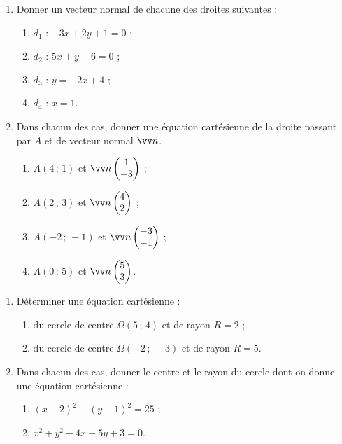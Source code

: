 \documentclass[a4paper,11pt]{article}
\begin{document}
\begin{cexercice}
\vspace{-0.8\baselineskip}
\begin{enumerate}[leftmargin=*]
	\item Donner un vecteur normal de chacune des droites suivantes :
	\begin{enumerate}
		\item $d_1$ : $-3x + 2y + 1 = 0$ ;
		\item $d_2$ : $5x + y - 6 = 0$ ;
		\item $d_3$ : $y=-2x+4$ ;
		\item $d_4$ : $x=1$.
	\end{enumerate}
	\item Dans chacun des cas, donner une équation cartésienne de la droite passant par $A$ et de vecteur normal $\vect{n}$.
	\begin{enumerate}
		\item $A(4\,;\,1)$ et $\vect{n} \coordeux{1}{-3}$ ;
		\item $A(2\,;\,3)$ et $\vect{n} \coordeux{4}{2}$ ;
		\item $A(-2\,;\,-1)$ et $\vect{n} \coordeux{-3}{-1}$ ;
		\item $A(0\,;\,5)$ et $\vect{n} \coordeux{5}{3}$.
	\end{enumerate}
\end{enumerate}
\end{cexercice}

\begin{cexercice}
\vspace{-0.8\baselineskip}
\begin{enumerate}[leftmargin=*]
	\item Déterminer une équation cartésienne :
	\begin{enumerate}
		\item du cercle de centre $\Omega(5\,;\,4)$ et de rayon $R=2$ ;
		\item du cercle de centre $\Omega(-2\,;\,-3)$ et de rayon $R=5$.
	\end{enumerate}
	\item Dans chacun des cas, donner le centre et le rayon du cercle dont on donne une équation cartésienne :
	\begin{enumerate}
		\item $(x-2)^2+(y+1)^2=25$ ;
		\item $x^2+y^2-4x+5y+3=0$.
	\end{enumerate}
\end{enumerate}
\end{cexercice}
\end{document}
